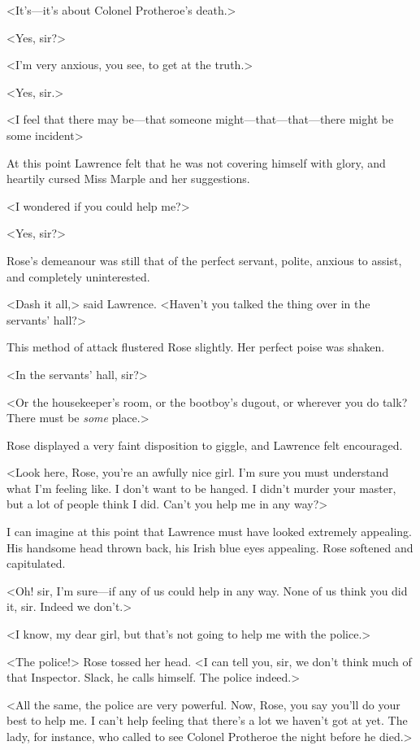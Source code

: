 <It's—it's about Colonel Protheroe's death.>

<Yes, sir?>

<I'm very anxious, you see, to get at the truth.>

<Yes, sir.>

<I feel that there may be—that someone might—that—that—there might be some incident\longdash>

At this point Lawrence felt that he was not covering himself with glory, and heartily cursed Miss Marple and her suggestions.

<I wondered if you could help me?>

<Yes, sir?>

Rose's demeanour was still that of the perfect servant, polite, anxious to assist, and completely uninterested.

<Dash it all,> said Lawrence. <Haven't you talked the thing over in the servants' hall?>

This method of attack flustered Rose slightly. Her perfect poise was shaken.

<In the servants' hall, sir?>

<Or the housekeeper's room, or the bootboy's dugout, or wherever you do talk? There must be \textit{some} place.>

Rose displayed a very faint disposition to giggle, and Lawrence felt encouraged.

<Look here, Rose, you're an awfully nice girl. I'm sure you must understand what I'm feeling like. I don't want to be hanged. I didn't murder your master, but a lot of people think I did. Can't you help me in any way?>

I can imagine at this point that Lawrence must have looked extremely appealing. His handsome head thrown back, his Irish blue eyes appealing. Rose softened and capitulated.

<Oh! sir, I'm sure—if any of us could help in any way. None of us think you did it, sir. Indeed we don't.>

<I know, my dear girl, but that's not going to help me with the police.>

<The police!> Rose tossed her head. <I can tell you, sir, we don't think much of that Inspector. Slack, he calls himself. The police indeed.>

<All the same, the police are very powerful. Now, Rose, you say you'll do your best to help me. I can't help feeling that there's a lot we haven't got at yet. The lady, for instance, who called to see Colonel Protheroe the night before he died.>

